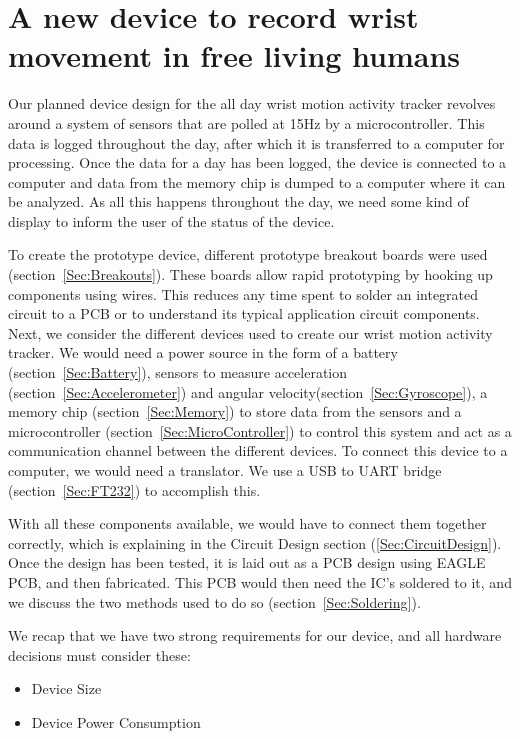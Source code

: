 \chapter{A new device to record wrist movement in free living humans}
\label{Chap:Methods}

Our planned device design for the all day wrist motion activity tracker revolves around a system of sensors that are polled at 15Hz by a microcontroller. This data is logged throughout the day, after which it is transferred to a computer for processing. Once the data for a day has been logged, the device is connected to a computer and data from the memory chip is dumped to a computer where it can be analyzed. As all this happens throughout the day, we need some kind of display to inform the user of the status of the device.

To create the prototype device, different prototype breakout boards were used (section~\ref{Sec:Breakouts}). These boards allow rapid prototyping by hooking up components using wires. This reduces any time spent to solder an integrated circuit to a PCB or to understand its typical application circuit components. Next, we consider the different devices used to create our wrist motion activity tracker. We would need a power source in the form of a battery (section~\ref{Sec:Battery}), sensors to measure acceleration (section~\ref{Sec:Accelerometer}) and angular velocity(section~\ref{Sec:Gyroscope}), a memory chip (section~\ref{Sec:Memory}) to store data from the sensors and a microcontroller (section~\ref{Sec:MicroController}) to control this system and act as a communication channel between the different devices. To connect this device to a computer, we would need a translator. We use a USB to UART bridge (section~\ref{Sec:FT232}) to accomplish this.

With all these components available, we would have to connect them together correctly, which is explaining in the Circuit Design section (\ref{Sec:CircuitDesign}). Once the design has been tested, it is laid out as a PCB design using EAGLE PCB, and then fabricated. This PCB would then need the IC's soldered to it, and we discuss the two methods used to do so (section~\ref{Sec:Soldering}).

We recap that we have two strong requirements for our device, and all hardware decisions must consider these:
\begin{itemize}
  \item Device Size
  \item Device Power Consumption
\end{itemize}

